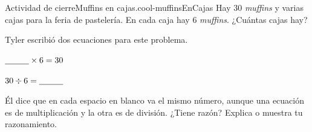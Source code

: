 \documentclass[14pt]{extarticle}
\begin{document}
\begin{project}{Actividad de cierre}{Muffins en cajas.}{cool-muffinsEnCajas}%
Hay 30 \emph{muffins} y varias cajas para la feria de pastelería. En cada caja hay 6 \emph{muffins}. ¿Cuántas cajas hay?%
\begin{sidebyside}{2}{0.05}{0.05}{0.1}%
\begin{sbspanel}{0.4}%
Tyler escribió dos ecuaciones para este problema.%
\end{sbspanel}%
\begin{sbspanel}{0.4}%
\(\underline{\hspace{1 cm}} \times 6 = 30\)%
\par
\(30 \div 6 = \underline{\hspace{1 cm}}\)%
\end{sbspanel}%
\end{sidebyside}%
\par
Él dice que en cada espacio en blanco va el mismo número, aunque una ecuación es de multiplicación y la otra es de división. ¿Tiene razón? Explica o muestra tu razonamiento.%
\begin{image}{0}{1}{0}{}%

\end{image}
\end{project}
\end{document}
